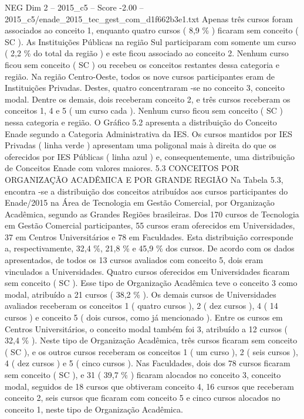 \begin{textsample}{NEG Dim 2 – 2015\_c5 – Score -2.00 – 2015\_c5/enade\_2015\_tec\_gest\_com\_d1f662b3e1.txt}
Apenas três cursos foram associados ao conceito 1, enquanto quatro cursos ( 8,9 \% ) ficaram sem conceito ( SC ).
As Instituições Públicas na região Sul participaram com somente um curso ( 2,2 \% do total da região ) e este ficou associado ao conceito 2.
Nenhum curso ficou sem conceito ( SC ) ou recebeu os conceitos restantes dessa categoria e região.
Na região Centro-Oeste, todos os nove cursos participantes eram de Instituições Privadas.
Destes, quatro concentraram -se no conceito 3, conceito modal.
Dentre os demais, dois receberam conceito 2, e três cursos receberam os conceitos 1, 4 e 5 ( um curso cada ).
Nenhum curso ficou sem conceito ( SC ) nessa categoria e região.
O Gráfico 5.2 apresenta a distribuição do Conceito Enade segundo a Categoria Administrativa da IES.
Os cursos mantidos por IES Privadas ( linha verde ) apresentam uma poligonal mais à direita do que os oferecidos por IES Públicas ( linha azul ) e, consequentemente, uma distribuição de Conceitos Enade com valores maiores. 5.3 CONCEITOS POR ORGANIZAÇÃO ACADÊMICA E POR GRANDE REGIÃO Na Tabela 5.3, encontra -se a distribuição dos conceitos atribuídos aos cursos participantes do Enade/2015 na Área de Tecnologia em Gestão Comercial, por Organização Acadêmica, segundo as Grandes Regiões brasileiras.
Dos 170 cursos de Tecnologia em Gestão Comercial participantes, 55 cursos eram oferecidos em Universidades, 37 em Centros Universitários e 78 em Faculdades.
Esta distribuição corresponde a, respectivamente, 32,4 \%, 21,8 \% e 45,9 \% dos cursos.
De acordo com os dados apresentados, de todos os 13 cursos avaliados com conceito 5, dois eram vinculados a Universidades.
Quatro cursos oferecidos em Universidades ficaram sem conceito ( SC ).
Esse tipo de Organização Acadêmica teve o conceito 3 como modal, atribuído a 21 cursos ( 38,2 \% ).
Os demais cursos de Universidades avaliados receberam os conceitos 1 ( quatro cursos ), 2 ( dez cursos ), 4 ( 14 cursos ) e conceito 5 ( dois cursos, como já mencionado ).
Entre os cursos em Centros Universitários, o conceito modal também foi 3, atribuído a 12 cursos ( 32,4 \% ).
Neste tipo de Organização Acadêmica, três cursos ficaram sem conceito ( SC ), e os outros cursos receberam os conceitos 1 ( um curso ), 2 ( seis cursos ), 4 ( dez cursos ) e 5 ( cinco cursos ).
Nas Faculdades, dois dos 78 cursos ficaram sem conceito ( SC ), e 31 ( 39,7 \% ) ficaram alocados no conceito 3, conceito modal, seguidos de 18 cursos que obtiveram conceito 4, 16 cursos que receberam conceito 2, seis cursos que ficaram com conceito 5 e cinco cursos alocados no conceito 1, neste tipo de Organização Acadêmica.

\end{textsample}
